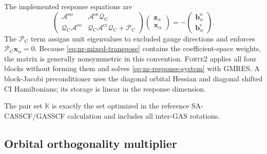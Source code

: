 \documentclass[aip,preprint,nofootinbib]{revtex4-1}
\newcommand{\forte}{\textsc{Forte2}\xspace}
\begin{document}
The implemented response equations are
\begin{equation}
 \boxed{
 \begin{pmatrix}
 \mathcal A^{\mathrm{oo}}
 &\mathcal A^{\mathrm{oc}}\mathcal Q_{\mathrm C}\\
 \mathcal Q_{\mathrm C}\mathcal A^{\mathrm{co}}
 &\mathcal Q_{\mathrm C}\mathcal A^{\mathrm{cc}}
  \mathcal Q_{\mathrm C}+\mathcal P_{\mathrm C}
 \end{pmatrix}
 \begin{pmatrix}\mathbf z_\alpha\\\mathbf x_\alpha\end{pmatrix}
 =-
 \begin{pmatrix}\mathbf b^\mathrm{o}_\alpha\\
                 \mathbf b^\mathrm{c}_\alpha\end{pmatrix}
 }.
 \label{eq:nr-response-system}
\end{equation}
The $\mathcal P_{\mathrm C}$ term assigns unit eigenvalues to excluded gauge
directions and enforces
$\mathcal P_{\mathrm C}\mathbf x_\alpha=0$.  Because
\cref{eq:nr-mixed-transpose} contains the coefficient-space weights, the
matrix is generally nonsymmetric in this convention.  \forte applies all four
blocks without forming them and solves \cref{eq:nr-response-system} with
GMRES.  A block-Jacobi preconditioner uses the diagonal orbital Hessian and
diagonal shifted CI Hamiltonians; its storage is linear in the response
dimension.

The pair set $\mathbb K$ is exactly the set optimized in the reference
SA-CASSCF/GASSCF calculation and includes all inter-GAS rotations.

\subsection{Orbital orthogonality multiplier}
\end{document}
